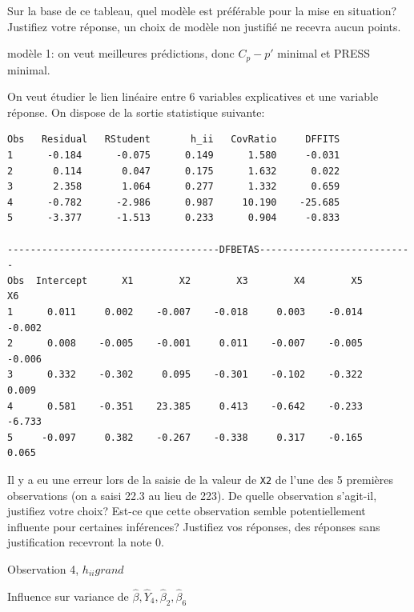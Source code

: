 \begin{questions}
	\vspace{0.1in}
	Sur la base de ce tableau, quel mod\`ele est préférable pour la mise en situation? Justifiez votre réponse, un choix de modèle non justifié ne recevra aucun points.

\begin{solution}
    modèle 1: on veut meilleures prédictions, donc $C_p-p'$ minimal et PRESS minimal.
\end{solution}
\newpage

\question[8]\label{influence}

On veut étudier le lien linéaire entre 6 variables explicatives et une variable réponse. On dispose de la sortie statistique suivante:

\begin{verbatim}
Obs   Residual   RStudent       h_ii   CovRatio     DFFITS
1      -0.184      -0.075      0.149      1.580     -0.031
2       0.114       0.047      0.175      1.632      0.022
3       2.358       1.064      0.277      1.332      0.659
4      -0.782      -2.986      0.987     10.190    -25.685
5      -3.377      -1.513      0.233      0.904     -0.833

-------------------------------------DFBETAS---------------------------
Obs  Intercept      X1        X2        X3        X4        X5        X6
1      0.011     0.002    -0.007    -0.018     0.003    -0.014    -0.002
2      0.008    -0.005    -0.001     0.011    -0.007    -0.005    -0.006
3      0.332    -0.302     0.095    -0.301    -0.102    -0.322     0.009
4      0.581    -0.351    23.385     0.413    -0.642    -0.233    -6.733
5     -0.097     0.382    -0.267    -0.338     0.317    -0.165     0.065

\end{verbatim}

Il y a eu une erreur lors de la saisie de la valeur de \texttt{X2} de l'une des 5 premières observations (on a saisi 22.3 au lieu de 223). De quelle observation s'agit-il, justifiez votre choix? Est-ce que cette observation semble potentiellement influente pour certaines inférences? Justifiez vos réponses, des réponses sans justification recevront la note 0.

\begin{solution}

    Observation 4, $h_{ii} grand$

    Influence sur variance de $\widehat{\beta}, \widehat{Y}_4, \widehat{\beta}_2, \widehat{\beta}_6$    
\end{solution}
\newpage


\end{questions}
